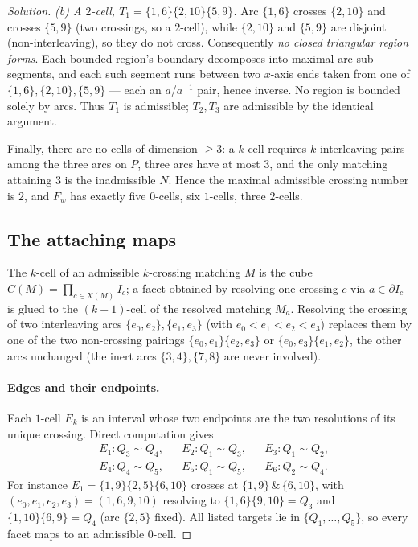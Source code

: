\documentclass{amsart}
\theoremstyle{definition}
\newcommand{\bdy}{\partial}
\begin{document}
\begin{proof}[Solution]
\emph{(b) A $2$-cell, $T_1=\{1,6\}\{2,10\}\{5,9\}$.} Arc $\{1,6\}$ crosses $\{2,10\}$ and
crosses $\{5,9\}$ (two crossings, so a $2$-cell), while $\{2,10\}$ and $\{5,9\}$ are disjoint
(non-interleaving), so they do not cross. Consequently \emph{no closed triangular region
forms}. Each bounded region's boundary decomposes into maximal arc sub-segments, and each such
segment runs between two $x$-axis ends taken from one of $\{1,6\},\{2,10\},\{5,9\}$ --- each an
$a$/$a^{-1}$ pair, hence inverse. No region is bounded solely by arcs. Thus $T_1$ is
admissible; $T_2,T_3$ are admissible by the identical argument.

Finally, there are no cells of dimension $\ge 3$: a $k$-cell requires $k$ interleaving pairs
among the three arcs on $P$, three arcs have at most $3$, and the only matching attaining $3$
is the inadmissible $N$. Hence the maximal admissible crossing number is $2$, and $F_w$ has
exactly five $0$-cells, six $1$-cells, three $2$-cells.

\subsection{The attaching maps}\label{sec:attach}

The $k$-cell of an admissible $k$-crossing matching $M$ is the cube
$C(M)=\prod_{c\in X(M)}I_c$; a facet obtained by resolving one crossing $c$ via $a\in\bdy I_c$
is glued to the $(k-1)$-cell of the resolved matching $M_a$. Resolving the crossing of two
interleaving arcs $\{e_0,e_2\},\{e_1,e_3\}$ (with $e_0<e_1<e_2<e_3$) replaces them by one of
the two non-crossing pairings $\{e_0,e_1\}\{e_2,e_3\}$ or $\{e_0,e_3\}\{e_1,e_2\}$, the other
arcs unchanged (the inert arcs $\{3,4\},\{7,8\}$ are never involved).

\paragraph{Edges and their endpoints.}
Each $1$-cell $E_k$ is an interval whose two endpoints are the two resolutions of its unique
crossing. Direct computation gives
\begin{equation}\label{eq:edges}
\begin{aligned}
&E_1: Q_3\!\sim\!Q_4, && E_2: Q_1\!\sim\!Q_3, && E_3: Q_1\!\sim\!Q_2,\\
&E_4: Q_4\!\sim\!Q_5, && E_5: Q_1\!\sim\!Q_5, && E_6: Q_2\!\sim\!Q_4.
\end{aligned}
\end{equation}
For instance $E_1=\{1,9\}\{2,5\}\{6,10\}$ crosses at $\{1,9\}\,\&\,\{6,10\}$, with
$(e_0,e_1,e_2,e_3)=(1,6,9,10)$ resolving to $\{1,6\}\{9,10\}=Q_3$ and $\{1,10\}\{6,9\}=Q_4$
(arc $\{2,5\}$ fixed). All listed targets lie in $\{Q_1,\dots,Q_5\}$, so every facet maps to
an admissible $0$-cell.


\end{proof}
\end{document}
